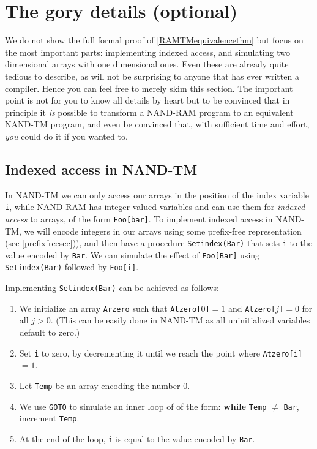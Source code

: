 \section{The gory details (optional)}\label{nandtmgorydetailssec}

We do not show the full formal proof of \cref{RAMTMequivalencethm} but
focus on the most important parts: implementing indexed access, and
simulating two dimensional arrays with one dimensional ones. Even these
are already quite tedious to describe, as will not be surprising to
anyone that has ever written a compiler. Hence you can feel free to
merely skim this section. The important point is not for you to know all
details by heart but to be convinced that in principle it \emph{is}
possible to transform a NAND-RAM program to an equivalent NAND-TM
program, and even be convinced that, with sufficient time and effort,
\emph{you} could do it if you wanted to.

\subsection{Indexed access in NAND-TM}\label{Indexed-access-in-NAND-TM}

In NAND-TM we can only access our arrays in the position of the index
variable \texttt{i}, while NAND-RAM has integer-valued variables and can
use them for \emph{indexed access} to arrays, of the form
\texttt{Foo[bar]}. To implement indexed access in NAND-TM, we will
encode integers in our arrays using some prefix-free representation (see
\cref{prefixfreesec})), and then have a procedure \texttt{Setindex(Bar)}
that sets \texttt{i} to the value encoded by \texttt{Bar}. We can
simulate the effect of \texttt{Foo[Bar]} using \texttt{Setindex(Bar)}
followed by \texttt{Foo[i]}.

Implementing \texttt{Setindex(Bar)} can be achieved as follows:

\begin{enumerate}
\def\labelenumi{\arabic{enumi}.}
\item
  We initialize an array \texttt{Arzero} such that
  \texttt{Atzero[}\(0\)\texttt{]}\(=1\) and
  \texttt{Atzero[}\(j\)\texttt{]}\(=0\) for all \(j>0\). (This can be
  easily done in NAND-TM as all uninitialized variables default to
  zero.)
\item
  Set \texttt{i} to zero, by decrementing it until we reach the point
  where \texttt{Atzero[i]}\(=1\).
\item
  Let \texttt{Temp} be an array encoding the number \(0\).
\item
  We use \texttt{GOTO} to simulate an inner loop of of the form:
  \textbf{while} \texttt{Temp} \(\neq\) \texttt{Bar}, increment
  \texttt{Temp}.
\item
  At the end of the loop, \texttt{i} is equal to the value encoded by
  \texttt{Bar}.
\end{enumerate}

